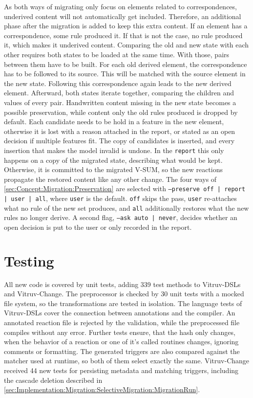 As both ways of migrating only focus on elements related to correspondences, underived content will not automatically get included.
Therefore, an additional phase after the migration is added to keep this extra content.
If an element has a correspondence, some rule produced it.
If that is not the case, no rule produced it, which makes it underived content.
Comparing the old and new state with each other requires both states to be loaded at the same time.
With those, pairs between them have to be built.
For each old derived element, the correspondence has to be followed to its source.
This will be matched with the source element in the new state.
Following this correspondence again leads to the new derived element.
Afterward, both states iterate together, comparing the children and values of every pair.
Handwritten content missing in the new state becomes a possible preservation, while content only the old rules produced is dropped by default.
Each candidate needs to be hold in a feature in the new element, otherwise it is lost with a reason attached in the report, or stated as an open decision if multiple features fit.
The copy of candidates is inserted, and every insertion that makes the model invalid is undone.
In the \texttt{report} this only happens on a copy of the migrated state, describing what would be kept.
Otherwise, it is committed to the migrated V-SUM, so the new reactions propagate the restored content like any other change.
The four ways of \autoref{sec:Concept:Migration:Preservation} are selected with \texttt{--preserve off | report | user | all}, where \texttt{user} is the default.
\texttt{off} skips the pass, \texttt{user} re-attaches what no rule of the new set produces, and \texttt{all} additionally restores what the new rules no longer derive.
A second flag, \texttt{--ask auto | never}, decides whether an open decision is put to the user or only recorded in the report.

\section{Testing}
\label{sec:Implementation:Testing}

All new code is covered by unit tests, adding 339 test methods to Vitruv-DSLs and Vitruv-Change.
The preprocessor is checked by 30 unit tests with a mocked file system, so the transformations are tested in isolation.
The language tests of Vitruv-DSLs \cite{vitruv-dsls-fork} cover the connection between annotations and the compiler.
An annotated reaction file is rejected by the validation, while the preprocessed file compiles without any error.
Further tests ensure, that the hash only changes, when the behavior of a reaction or one of it's called routines changes, ignoring comments or formatting.
The generated triggers are also compared against the matcher used at runtime, so both of them select exactly the same.
Vitruv-Change \cite{vitruv-change-fork} received 44 new tests for persisting metadata and matching triggers, including the cascade deletion described in \autoref{sec:Implementation:Migration:SelectiveMigration:MigrationRun}.


